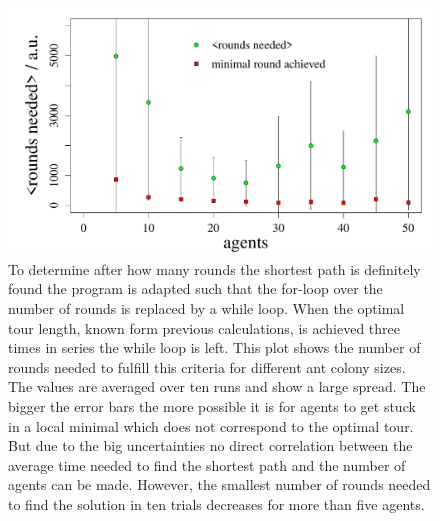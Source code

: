 
\begin{figure}[h!]
\begin{center}
\includegraphics[width=0.9\linewidth]{rounds_needed_average_vs_shortestpath}
\caption{To determine after how many rounds the shortest path is definitely found the program is adapted such that the for-loop over the number of rounds is replaced by a while loop. When the optimal tour length, known form previous calculations, is achieved three times in series the while loop is left. This plot shows the number of rounds needed to fulfill this criteria for different ant colony sizes. The values are averaged over ten runs and show a large spread. The bigger the error bars the more possible it is for agents to get stuck in a local minimal which does not correspond to the optimal tour. But due to the big uncertainties no direct correlation between the average time needed to find the shortest path and the number of agents can be made. However, the smallest number of rounds needed to find the solution in ten trials decreases for more than five agents.}
\label{fig:speed}
\end{center}
\end{figure}